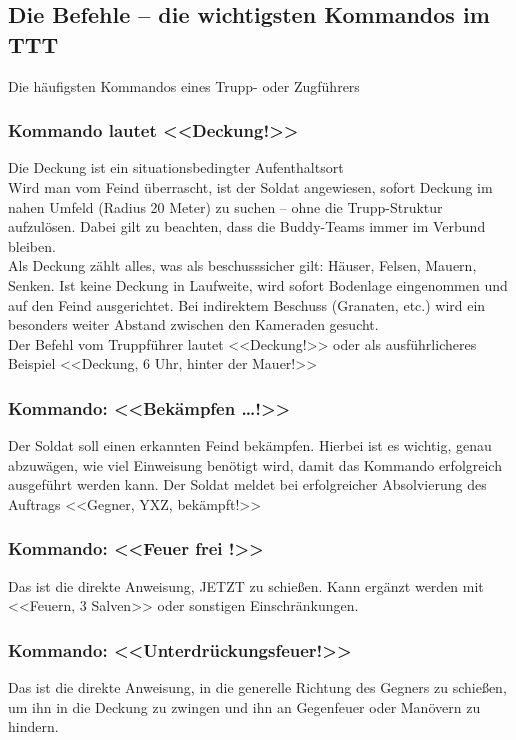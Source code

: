 \newpage
\subsection{Die Befehle – die wichtigsten Kommandos im TTT}
Die häufigsten Kommandos eines Trupp- oder Zugführers \\
\subsubsection{Kommando lautet <<Deckung!>>}
 Die Deckung ist ein situationsbedingter Aufenthaltsort \\ 
Wird man vom Feind überrascht, ist der Soldat angewiesen, sofort Deckung im nahen Umfeld (Radius 20 Meter) zu suchen – ohne die Trupp-Struktur aufzulösen. Dabei gilt zu beachten, dass die Buddy-Teams immer im Verbund bleiben. \\
Als Deckung zählt alles, was als beschusssicher gilt: Häuser, Felsen, Mauern, Senken. Ist keine Deckung in Laufweite, wird sofort Bodenlage eingenommen und auf den Feind ausgerichtet. Bei indirektem Beschuss (Granaten, etc.) wird ein besonders weiter Abstand zwischen den Kameraden gesucht.\\
Der Befehl vom Truppführer lautet <<Deckung!>> oder als ausführlicheres Beispiel <<Deckung, 6 Uhr, hinter der Mauer!>> \\
\subsubsection{Kommando: <<Bekämpfen …!>>}
Der Soldat soll einen erkannten Feind bekämpfen. Hierbei ist es wichtig, genau abzuwägen, wie viel Einweisung benötigt wird, damit das Kommando erfolgreich ausgeführt werden kann. Der Soldat meldet bei erfolgreicher Absolvierung des Auftrags <<Gegner, YXZ, bekämpft!>> \\
\subsubsection{Kommando: <<Feuer frei !>>}
Das ist die direkte Anweisung, JETZT zu schießen. Kann ergänzt werden mit <<Feuern, 3 Salven>> oder sonstigen Einschränkungen. \\
\subsubsection{Kommando: <<Unterdrückungsfeuer!>>}
Das ist die direkte Anweisung, in die generelle Richtung des Gegners zu schießen, um ihn in die Deckung zu zwingen und ihn an Gegenfeuer oder Manövern zu hindern. \\

